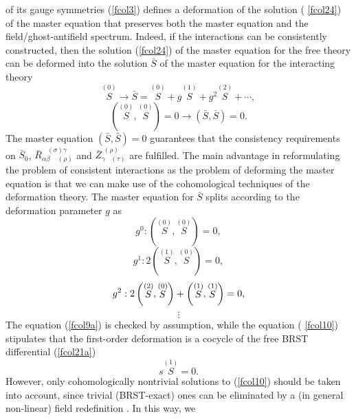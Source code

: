 \documentclass[a4paper,12pt]{article}
\begin{document}
of its gauge symmetries (\ref{fcol3}) defines a deformation of the solution (%
\ref{fcol24}) of the master equation that preserves both the master equation
and the field/ghost-antifield spectrum. Indeed, if the interactions can be
consistently constructed, then the solution (\ref{fcol24}) of the master
equation for the free theory can be deformed into the solution $\bar{S}$ of
the master equation for the interacting theory 
\begin{equation}
\stackrel{(0)}{S}\rightarrow \bar{S}=\stackrel{(0)}{S}+g\stackrel{(1)}{S}%
+g^{2}\stackrel{(2)}{S}+\cdots ,  \label{fcol25}
\end{equation}
\begin{equation}
\left( \stackrel{(0)}{S},\stackrel{(0)}{S}\right) =0\rightarrow \left( \bar{S%
},\bar{S}\right) =0.  \label{fcol7}
\end{equation}
The master equation $\left( \bar{S},\bar{S}\right) =0$ guarantees that the
consistency requirements on $\bar{S}_{0}$, $\bar{R}_{\alpha \beta
\;\;\;\;(\rho )}^{\;\;\;(\sigma )\gamma }$ and $\bar{Z}_{\gamma \;\;\;(\tau
)}^{\;(\rho )}$ are fulfilled. The main advantage in reformulating the
problem of consistent interactions as the problem of deforming the master
equation is that we can make use of the cohomological techniques of the
deformation theory. The master equation for $\bar{S}$ splits according to
the deformation parameter $g$ as 
\begin{equation}
g^{0}:\left( \stackrel{(0)}{S},\stackrel{(0)}{S}\right) =0,  \label{fcol9a}
\end{equation}
\begin{equation}
g^{1}:2\left( \stackrel{(1)}{S},\stackrel{(0)}{S}\right) =0,  \label{fcol10}
\end{equation}
\begin{equation}
g^{2}:2\left( \stackrel{(2)}{S},\stackrel{(0)}{S}\right) +\left( \stackrel{%
(1)}{S},\stackrel{(1)}{S}\right) =0,  \label{fcol11}
\end{equation}
\[
\vdots 
\]
The equation (\ref{fcol9a}) is checked by assumption, while the equation (%
\ref{fcol10}) stipulates that the first-order deformation is a cocycle of
the free BRST differential (\ref{fcol21a}) 
\begin{equation}
s\stackrel{(1)}{S}=0.  \label{fcol30}
\end{equation}
However, only cohomologically nontrivial solutions to (\ref{fcol10}) should
be taken into account, since trivial (BRST-exact) ones can be eliminated by
a (in general non-linear) field redefinition \cite{21and5}. In this way, we
\end{document}
